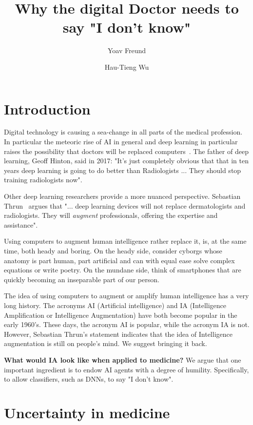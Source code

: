 \documentclass[fleqn,10pt]{wlscirep}
\title{Why the digital Doctor needs to say "I don't know"}
\author[1]{Yoav Freund}
\author[2]{Hau-Tieng Wu}
\affil[1]{UCSD, department, city, postcode, country}
\affil[2]{Duke, department, city, postcode, country}
\begin{document}
\flushbottom
\maketitle

\thispagestyle{empty}

\section*{Introduction}

Digital technology is causing a sea-change in all parts of the medical profession. In particular the meteoric rise of AI in general and deep learning in particular raises the possibility that doctors will be replaced computers~\cite{Mukherjee2017}. The father of deep learning, Geoff Hinton, said in 2017: "It's just completely obvious that that in ten years deep learning is going to do better than Radiologists ... They should stop training radiologists now".

Other deep learning researchers provide a more nuanced perspective. Sebastian Thrun~\cite{Mukherjee2017,esteva2017dermatologist} argues that "... deep learning devices will not replace dermatologists and radiologists. They will {\em augment} professionals, offering the expertise and assistance".

Using computers to augment human intelligence rather replace it, is, at the same time, both heady and boring. On the heady side, consider cyborgs whose anatomy is part human, part artificial and can with equal ease solve complex equations or write poetry. On the mundane side, think of smartphones that are quickly becoming an inseparable part of our person. 
 
The idea of using computers to augment or amplify human intelligence has a very long history. The acronyms AI (Artificial intelligence) and IA (Intelligence Amplification or Intelligence Augmentation) have both become popular in the early 1960's\cite{ashby1957introduction,engelbart1962augmenting}. These days, the acronym AI is popular, while the acronym IA is not. However, Sebastian Thrun's statement indicates that the idea of Intelligence augmentation is still on people's mind. We suggest bringing it back.

{\bf What would IA look like when applied to medicine?} We argue that one important ingredient is to endow AI agents with a 
degree of humility. Specifically, to allow classifiers, such as DNNs, to say "I don't know". 

\section*{Uncertainty in medicine}
\end{document}
